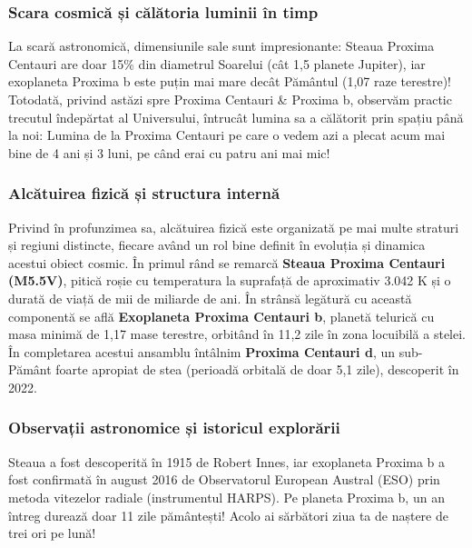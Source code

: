 \subsubsection*{Scara cosmică și călătoria luminii în timp}
La scară astronomică, dimensiunile sale sunt impresionante: Steaua Proxima Centauri are doar 15\% din diametrul Soarelui (cât 1,5 planete Jupiter), iar exoplaneta Proxima b este puțin mai mare decât Pământul (1,07 raze terestre)! Totodată, privind astăzi spre Proxima Centauri \& Proxima b, observăm practic trecutul îndepărtat al Universului, întrucât lumina sa a călătorit prin spațiu până la noi: Lumina de la Proxima Centauri pe care o vedem azi a plecat acum mai bine de 4 ani și 3 luni, pe când erai cu patru ani mai mic!

\subsubsection*{Alcătuirea fizică și structura internă}
Privind în profunzimea sa, alcătuirea fizică este organizată pe mai multe straturi și regiuni distincte, fiecare având un rol bine definit în evoluția și dinamica acestui obiect cosmic. În primul rând se remarcă \textbf{Steaua Proxima Centauri (M5.5V)}, pitică roșie cu temperatura la suprafață de aproximativ 3.042 K și o durată de viață de mii de miliarde de ani. În strânsă legătură cu această componentă se află \textbf{Exoplaneta Proxima Centauri b}, planetă telurică cu masa minimă de 1,17 mase terestre, orbitând în 11,2 zile în zona locuibilă a stelei. În completarea acestui ansamblu întâlnim \textbf{Proxima Centauri d}, un sub-Pământ foarte apropiat de stea (perioadă orbitală de doar 5,1 zile), descoperit în 2022.

\subsubsection*{Observații astronomice și istoricul explorării}
Steaua a fost descoperită în 1915 de Robert Innes, iar exoplaneta Proxima b a fost confirmată în august 2016 de Observatorul European Austral (ESO) prin metoda vitezelor radiale (instrumentul HARPS). Pe planeta Proxima b, un an întreg durează doar 11 zile pământești! Acolo ai sărbători ziua ta de naștere de trei ori pe lună!

